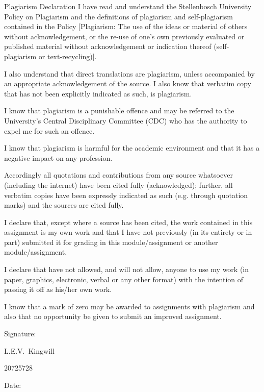 \begin{Summary}{Plagiarism Declaration}
	I have read and understand the Stellenbosch University Policy on Plagiarism and the definitions of plagiarism and self-plagiarism contained in the Policy [Plagiarism: The use of the ideas or material of others without acknowledgement, or the re-use of one's own previously evaluated or published material without acknowledgement or indication thereof (self-plagiarism or text-recycling)].\par
	\vspace{0.4cm}
	I also understand that direct translations are plagiarism, unless accompanied by an appropriate acknowledgement of the source. I also know that verbatim copy that has not been explicitly indicated as such, is plagiarism.\par
	\vspace{0.4cm}
	I know that plagiarism is a punishable offence and may be referred to the University's Central Disciplinary Committee (CDC) who has the authority to expel me for such an offence.\par
	\vspace{0.4cm}
	I know that plagiarism is harmful for the academic environment and that it has a negative impact on any profession.\par
	\vspace{0.4cm}
	Accordingly all quotations and contributions from any source whatsoever (including the internet) have been cited fully (acknowledged); further, all verbatim copies have been expressly indicated as such (e.g. through quotation marks) and the sources are cited fully.\par
	\vspace{0.4cm}
	I declare that, except where a source has been cited, the work contained in this assignment is my own work and that I have not previously (in its entirety or in part) submitted it for grading in this module/assignment or another module/assignment.\par
	\vspace{0.4cm}
	I declare that have not allowed, and will not allow, anyone to use my work (in paper, graphics, electronic, verbal or any other format) with the intention of passing it off as his/her own work. \par
	\vspace{0.4cm}
	I know that a mark of zero may be awarded to assignments with plagiarism and also that no opportunity be given to submit an improved assignment.\par
	\vspace{2cm} 
	
	
	\noindent%
	\parbox{.5\textwidth}{%
		Signature:\quad\dotfill\par
		\hfill L.E.V.\ Kingwill \hspace{1.2cm}\null\par
		\hfill 20725728 \hspace{1.2cm}\null}
	
	
	\vspace{1cm}
	\noindent%
	\parbox{.5\textwidth}{%
		Date:\quad\dotfill\par}
\end{Summary}